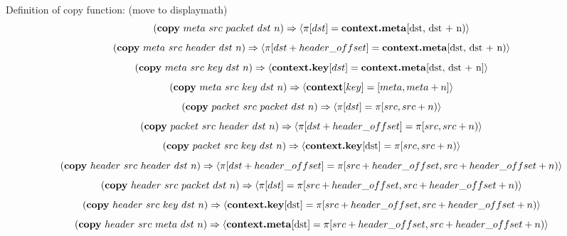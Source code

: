 Definition of copy function: (move to displaymath)
\begin{equation}
(\textrm{\textbf{copy}} \ meta \ src \ packet \ dst \ n) \Rightarrow
  \langle \pi[dst] = \textrm{\textbf{context.meta}[dst, dst + n)} \rangle
\end{equation}
\begin{equation}
  (\textrm{\textbf{copy}} \ meta \ src \ header \ dst \ n) \Rightarrow
  \langle \pi[dst + header\_offset] =
          \textrm{\textbf{context.meta}[dst, dst + n)} \rangle
\end{equation}
\begin{equation}
  (\textrm{\textbf{copy}} \ meta \ src \ key \ dst \ n) \Rightarrow
  \langle \textbf{\textrm{context.key}}[dst] =
          \textrm{\textbf{context.meta}[dst, dst + n]} \rangle
\end{equation}
\begin{equation}
  (\textrm{\textbf{copy}} \ meta \ src \ key \ dst \ n) \Rightarrow
  \langle \textbf{\textrm{context}}[key] =
          [meta, meta + n] \rangle
\end{equation}
\begin{equation}
  (\textrm{\textbf{copy}} \ packet \ src \ packet \ dst \ n) \Rightarrow
  \langle \pi[dst] = \pi[src, src + n) \rangle
\end{equation}
\begin{equation}
  (\textrm{\textbf{copy}} \ packet \ src \ header \ dst \ n) \Rightarrow
  \langle \pi[dst + header\_offset] = \pi[src, src + n) \rangle
\end{equation}
\begin{equation}
  (\textrm{\textbf{copy}} \ packet \ src \ key \ dst \ n) \Rightarrow
  \langle \textrm{\textbf{context.key}[dst]} = \pi[src, src + n) \rangle
\end{equation}
\begin{equation}
  (\textrm{\textbf{copy}} \ header \ src \ header \ dst \ n) \Rightarrow
  \langle \pi[dst + header\_offset] = \pi[src + header\_offset, src + header\_offset + n) \rangle
\end{equation}
\begin{equation}
  (\textrm{\textbf{copy}} \ header \ src \ packet \ dst \ n) \Rightarrow
  \langle \pi[dst] = \pi[src + header\_offset, src + header\_offset + n) \rangle
\end{equation}
\begin{equation}
  (\textrm{\textbf{copy}} \ header \ src \ key \ dst \ n) \Rightarrow
  \langle \textrm{\textbf{context.key}[dst]} = \pi[src + header\_offset, src + header\_offset + n) \rangle
\end{equation}
\begin{equation}
  (\textrm{\textbf{copy}} \ header \ src \ meta \ dst \ n) \Rightarrow
  \langle \textrm{\textbf{context.meta}[dst]} = \pi[src + header\_offset, src + header\_offset + n) \rangle
\end{equation}
